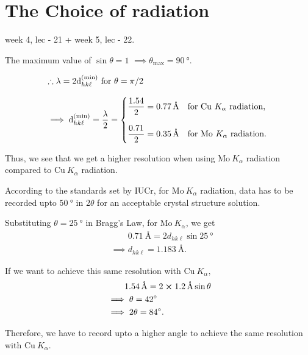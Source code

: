 \section{The Choice of radiation}
	
	week 4, lec - 21 + week 5, lec - 22.
	
The maximum value of $\sin \theta = 1$ $\implies \theta_\mathrm{max} = \SI{90}{\degree}.$

\begin{align}
&\therefore \lambda = 2 \d_{hk\ell}^\mathrm{(min)} ~ \mathrm{for} ~ \theta = \pi/2 \nonumber \\[0.8em]
&\implies \d_{hk\ell}^\mathrm{(min)} = \dfrac{\lambda}{2} = \begin{dcases*}
\dfrac{1.54}{2} = \SI{0.77}{\angstrom} & for $\mathrm{Cu}~K_\alpha$ radiation, \\[0.8em]
\dfrac{0.71}{2} = \SI{0.35}{\angstrom} & for $\mathrm{Mo}~K_\alpha$ radiation.
\end{dcases*}
\end{align}

Thus, we see that we get a higher resolution when using $\mathrm{Mo}~K_\alpha$ radiation compared to $\mathrm{Cu}~K_\alpha$ radiation.

According to the standards set by IUCr, for $\mathrm{Mo}~K_\alpha$ radiation, data has to be recorded  upto $\SI{50}{\degree}$ in $2\theta$ for an acceptable crystal structure solution.

Substituting $\theta = \SI{25}{\degree}$ in Bragg's Law, for $\mathrm{Mo}~K_\alpha$, we get%
%
\begin{align}
&\phantom{\implies} \SI{0.71}{\angstrom} = 2 d_{hk\ell} \sin \SI{25}{\degree} \nonumber \\
&\implies d_{hk\ell} = \SI{1.183}{\angstrom}.
\end{align}

If we want to achieve this same resolution with $\mathrm{Cu}~K_\alpha,$%
%
\begin{align}
&\phantom{\implies} \SI{1.54}{\angstrom} = 2 \cross \SI{1.2}{\angstrom} \sin \theta \nonumber \\
&\implies \theta = \SI{42}{\degree} \nonumber \\
&\implies 2\theta = \SI{84}{\degree}.
\end{align}

Therefore, we have to record upto a higher angle to achieve the same resolution with $\mathrm{Cu}~K_\alpha.$


